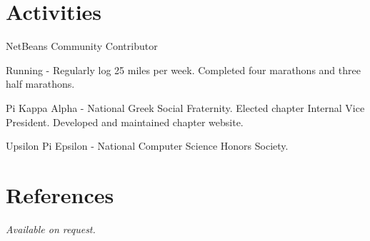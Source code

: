 \documentclass[margin,line]{resume}
\begin{document}
\begin{resume}
  \section{\mysidestyle \textcolor{mySideColor}{Activities}}

  NetBeans Community Contributor
	\vspace{-2mm}

	Running - Regularly log 25 miles per week. Completed four marathons
  and three half marathons.
	\vspace{-2mm}

  Pi Kappa Alpha - National Greek Social Fraternity. Elected chapter
  Internal Vice President. Developed and maintained chapter website.
	\vspace{-2mm}

  Upsilon Pi Epsilon - National Computer Science Honors Society.
	\vspace{-2mm}



  \section{\mysidestyle  \textcolor{mySideColor}{References}}
          {\sl Available on request.}


\end{resume}
\end{document}
